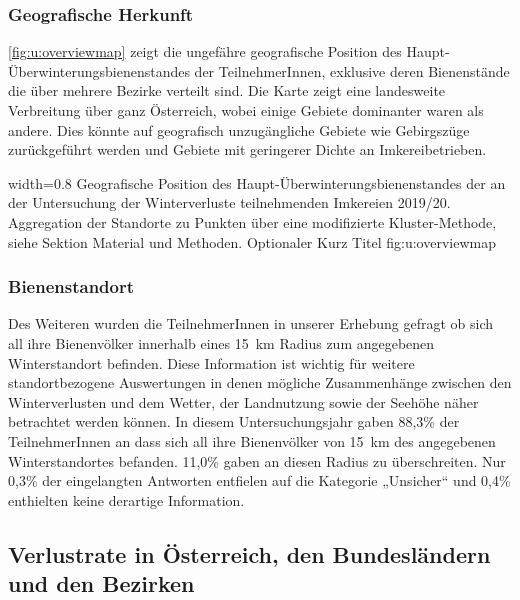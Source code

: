 \newpage

\subsubsection{Geografische Herkunft}

\cref{fig:u:overviewmap} zeigt die ungefähre geografische Position des Haupt-Überwinterungsbienenstandes der TeilnehmerInnen, exklusive deren Bienenstände die über mehrere Bezirke verteilt sind. Die Karte zeigt eine landesweite Verbreitung über ganz Österreich, wobei einige Gebiete dominanter waren als andere. Dies könnte auf geografisch unzugängliche Gebiete wie Gebirgszüge zurückgeführt werden und Gebiete mit geringerer Dichte an Imkereibetrieben.

  {width=0.8\textwidth} %
  {Geografische Position des Haupt-Überwinterungsbienenstandes der an der Untersuchung der Winterverluste teilnehmenden Imkereien 2019/20. Aggregation der Standorte zu Punkten über eine modifizierte Kluster-Methode, siehe Sektion Material und Methoden.} %
  {Optionaler Kurz Titel} %
  {fig:u:overviewmap} %

\subsubsection{Bienenstandort}

Des Weiteren wurden die TeilnehmerInnen in unserer Erhebung gefragt ob sich all ihre Bienenvölker innerhalb eines \SI{15}{\kilo\meter} Radius zum angegebenen Winterstandort befinden. Diese Information ist wichtig für weitere standortbezogene Auswertungen in denen mögliche Zusammenhänge zwischen den Winterverlusten und dem Wetter, der Landnutzung sowie der Seehöhe näher betrachtet werden können.
\newline
In diesem Untersuchungsjahr gaben 88,3\% der TeilnehmerInnen an dass sich all ihre Bienenvölker von \SI{15}{\kilo\meter} des angegebenen Winterstandortes befanden. 11,0\% gaben an diesen Radius zu überschreiten. Nur 0,3\% der eingelangten Antworten entfielen auf die Kategorie „Unsicher`` und 0,4\% enthielten keine derartige Information.

\subsection{Verlustrate in Österreich, den Bundesländern und den Bezirken}
